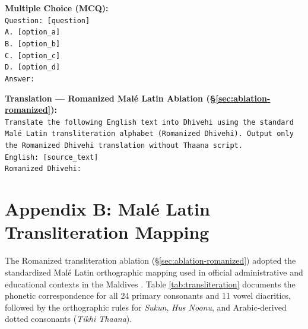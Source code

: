 \documentclass[acmsmall,review,anonymous]{acmart}
\begin{document}
\vspace{6pt}
\noindent\textbf{Multiple Choice (MCQ):}\\
\texttt{Question: [question]}\\
\texttt{A. [option\_a]}\\
\texttt{B. [option\_b]}\\
\texttt{C. [option\_c]}\\
\texttt{D. [option\_d]}\\
\texttt{Answer:}


\vspace{6pt}
\noindent\textbf{Translation --- Romanized Mal\'{e} Latin Ablation (\S\ref{sec:ablation-romanized}):}\\
\texttt{Translate the following English text into Dhivehi using the standard Mal\'{e} Latin transliteration alphabet (Romanized Dhivehi). Output only the Romanized Dhivehi translation without Thaana script.}\\
\texttt{English: [source\_text]}\\
\texttt{Romanized Dhivehi:}

\section*{Appendix B: Mal\'{e} Latin Transliteration Mapping}
The Romanized transliteration ablation (\S\ref{sec:ablation-romanized}) adopted the standardized Mal\'{e} Latin orthographic mapping used in official administrative and educational contexts in the Maldives \cite{gnanadesikan_dhivehi_2017}. Table \ref{tab:transliteration} documents the phonetic correspondence for all 24 primary consonants and 11 vowel diacritics, followed by the orthographic rules for \textit{Sukun}, \textit{Hus Noonu}, and Arabic-derived dotted consonants (\textit{Tikhi Thaana}).
\end{document}
